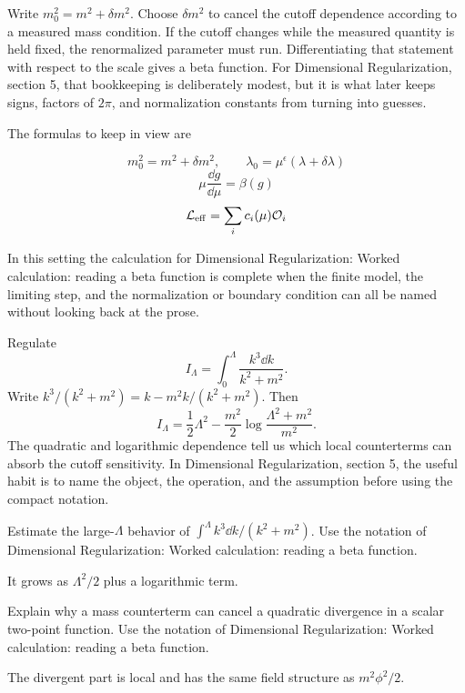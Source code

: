 Write \(m_0^2=m^2+\delta m^2\).  Choose \(\delta m^2\) to cancel the cutoff dependence according to a measured mass condition.  If the cutoff changes while the measured quantity is held fixed, the renormalized parameter must run.  Differentiating that statement with respect to the scale gives a beta function.  For Dimensional Regularization, section 5, that bookkeeping is deliberately modest, but it is what later keeps signs, factors of \(2\pi\), and normalization constants from turning into guesses.

The formulas to keep in view are

\[
  m_0^2=m^2+\delta m^2,\qquad \lambda_0=\mu^\epsilon(\lambda+\delta\lambda)
\]
\[
  \mu\frac{\dd g}{\dd\mu}=\beta(g)
\]
\[
  \mathcal L_{\mathrm{eff}}=\sum_i c_i(\mu)\mathcal O_i
\]

In this setting the calculation for Dimensional Regularization: Worked calculation: reading a beta function is complete when the finite model, the limiting step, and the normalization or boundary condition can all be named without looking back at the prose.




\begin{example}
Regulate
\[
  I_\Lambda=\int_0^\Lambda\frac{k^3\dd k}{k^2+m^2}.
\]
Write \(k^3/(k^2+m^2)=k-m^2k/(k^2+m^2)\).  Then
\[
  I_\Lambda=\frac12\Lambda^2-\frac{m^2}{2}\log\frac{\Lambda^2+m^2}{m^2}.
\]
The quadratic and logarithmic dependence tell us which local counterterms can absorb the cutoff sensitivity.  In Dimensional Regularization, section 5, the useful habit is to name the object, the operation, and the assumption before using the compact notation.
\end{example}



\begin{exercise}
Estimate the large-\(\Lambda\) behavior of \(\int^\Lambda k^3\dd k/(k^2+m^2)\).  Use the notation of Dimensional Regularization: Worked calculation: reading a beta function.
\begin{answer}
It grows as \(\Lambda^2/2\) plus a logarithmic term.
\end{answer}
\end{exercise}

\begin{exercise}
Explain why a mass counterterm can cancel a quadratic divergence in a scalar two-point function.  Use the notation of Dimensional Regularization: Worked calculation: reading a beta function.
\begin{answer}
The divergent part is local and has the same field structure as \(m^2\phi^2/2\).
\end{answer}
\end{exercise}



